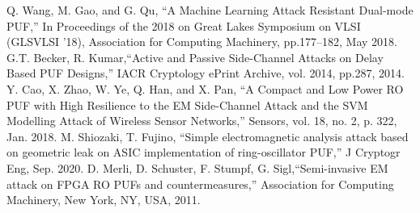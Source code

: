 \documentclass[technicalreport]{ieicej} %
\begin{document}
\begin{thebibliography}{99}
  Q. Wang, M. Gao, and G. Qu, “A Machine Learning Attack Resistant Dual-mode PUF,”
  In Proceedings of the 2018 on Great Lakes Symposium on VLSI (GLSVLSI '18),
  Association for Computing Machinery, pp.177–182, May 2018.
  G.T. Becker, R. Kumar,“Active and Passive Side-Channel Attacks on Delay Based PUF Designs,”
  IACR Cryptology ePrint Archive, vol. 2014, pp.287, 2014.
  Y. Cao, X. Zhao, W. Ye, Q. Han, and X. Pan, “A Compact and Low Power RO PUF with High Resilience to the EM Side-Channel Attack and the SVM Modelling Attack of Wireless Sensor Networks,”
  Sensors, vol. 18, no. 2, p. 322, Jan. 2018.
  M. Shiozaki, T. Fujino,
  “Simple electromagnetic analysis attack based on geometric leak on ASIC implementation of ring-oscillator PUF,”
  J Cryptogr Eng, Sep. 2020.
  D. Merli, D. Schuster, F. Stumpf, G. Sigl,“Semi-invasive EM attack on FPGA RO PUFs and countermeasures,”
  Association for Computing Machinery, New York, NY, USA, 2011.
\end{thebibliography}


\end{document}
